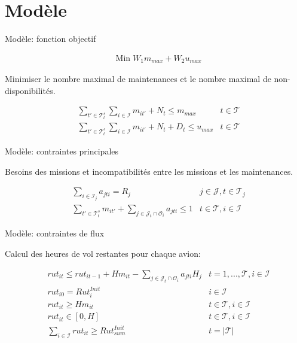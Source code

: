 \documentclass[ignorenonframetext,]{beamer}
\begin{document}
\section{Modèle}\label{modele}

\begin{frame}{Modèle: fonction objectif}

\begin{align}
    & \text{Min}\; W_1 m_{max} + W_2 u_{max}
\end{align}

\pause

Minimiser le nombre maximal de maintenances et le nombre maximal de
non-disponibilités.

\begin{align}
    &\sum_{t' \in \mathcal{T}^{s}_t} \sum_{i \in \mathcal{I}} m_{it'} + N_t \leq m_{max}
    &t \in \mathcal{T} \\
    &\sum_{t' \in \mathcal{T}^{s}_t} \sum_{i \in \mathcal{I}} m_{it'} + N_t + D_t\leq u_{max}
    &t \in \mathcal{T}
\end{align}

\end{frame}

\begin{frame}{Modèle: contraintes principales}

Besoins des missions et incompatibilités entre les missions et les
maintenances.

\begin{align}
&\sum_{i \in \mathcal{I}_j} a_{jti} = R_j
&j \in \mathcal{J}, t \in \mathcal{T}_j\\
&\sum_{t' \in \mathcal{T}^{s}_t} m_{it'} + \sum_{j \in \mathcal{J}_t \cap \mathcal{O}_i} a_{jti} \leq 1
& t \in \mathcal{T}, i \in \mathcal{I}
\end{align}

\end{frame}

\begin{frame}{Modèle: contraintes de flux}

Calcul des heures de vol restantes pour chaque avion:

\begin{align}
& rut_{it} \leq rut_{it-1} + H m_{it} - \sum_{j \in \mathcal{J}_t \cap \mathcal{O}_i} a_{jti} H_j & t =1, ..., \mathcal{T}, i \in \mathcal{I}\\
& rut_{i0} = Rut^{Init}_i
        & i \in \mathcal{I}\\
& rut_{it} \geq H m_{it}
        & t \in \mathcal{T}, i \in \mathcal{I}\\
& rut_{it} \in [0,H]
        & t \in \mathcal{T}, i \in \mathcal{I} \\
& \sum_{i \in \mathcal{I}} rut_{it} \geq Rut^{Init}_{sum}
        & t = |\mathcal{T}|
\end{align}

\end{frame}
\end{document}
